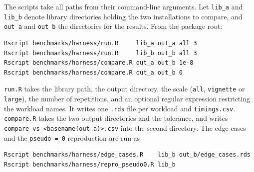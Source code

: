 \documentclass[11pt]{article}
\newcommand{\code}[1]{\texttt{#1}}
\begin{document}
The scripts take all paths from their command-line arguments. Let
\code{lib\_a} and \code{lib\_b} denote library directories holding the two
installations to compare, and \code{out\_a} and \code{out\_b} the directories
for the results. From the package root:

\begin{verbatim}
Rscript benchmarks/harness/run.R     lib_a out_a all 3
Rscript benchmarks/harness/run.R     lib_b out_b all 3
Rscript benchmarks/harness/compare.R out_a out_b 1e-8
Rscript benchmarks/harness/compare.R out_a out_b 0
\end{verbatim}

\noindent
\code{run.R} takes the library path, the output directory, the scale
(\code{all}, \code{vignette} or \code{large}), the number of repetitions, and
an optional regular expression restricting the workload names. It writes one
\code{.rds} file per workload and \code{timings.csv}. \code{compare.R} takes
the two output directories and the tolerance, and writes
\code{compare\_vs\_<basename(out\_a)>.csv} into the second directory. The edge
cases and the \code{pseudo = 0} reproduction are run as

\begin{verbatim}
Rscript benchmarks/harness/edge_cases.R    lib_b out_b/edge_cases.rds
Rscript benchmarks/harness/repro_pseudo0.R lib_b
\end{verbatim}
\end{document}
